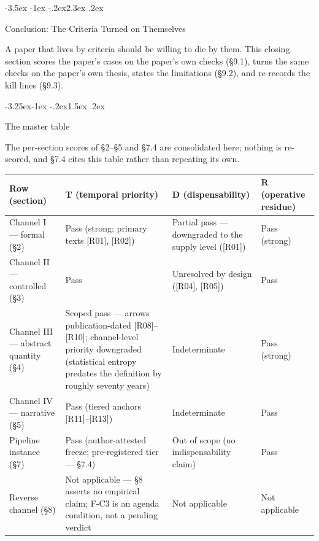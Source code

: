 \documentclass[11pt,a4paper]{article}
\makeatletter
\renewcommand\section{\@startsection{section}{1}{\z@}%
  {-3.5ex \@plus -1ex \@minus -.2ex}{2.3ex \@plus .2ex}%
  {\normalfont\Large\bfseries\raggedright}}
\renewcommand\subsection{\@startsection{subsection}{2}{\z@}%
  {-3.25ex\@plus -1ex \@minus -.2ex}{1.5ex \@plus .2ex}%
  {\normalfont\large\bfseries\raggedright}}
\makeatother
\begin{document}
\section{Conclusion: The Criteria Turned on Themselves}

A paper that lives by criteria should be willing to die by them. This closing section scores the paper's cases on the paper's own checks (§9.1), turns the same checks on the paper's own thesis, states the limitations (§9.2), and re-records the kill lines (§9.3).

\subsection{The master table}

The per-section scores of §2–§5 and §7.4 are consolidated here; nothing is re-scored, and §7.4 cites this table rather than repeating its own.

\begin{table}[htbp]
\centering
\footnotesize
\setlength{\tabcolsep}{3.5pt}
\renewcommand{\arraystretch}{1.18}
\begin{tabularx}{0.985\textwidth}{@{}>{\raggedright\arraybackslash}p{}>{\raggedright\arraybackslash}X>{\raggedright\arraybackslash}X>{\raggedright\arraybackslash}X@{}}
\toprule
\textbf{Row (section)} & \textbf{T (temporal priority)} & \textbf{D (dispensability)} & \textbf{R (operative residue)} \\
\midrule
Channel I — formal (§2) & Pass (strong; primary texts [R01], [R02]) & Partial pass — downgraded to the supply level ([R01]) & Pass (strong) \\
Channel II — controlled (§3) & Pass & Unresolved by design ([R04], [R05]) & Pass \\
Channel III — abstract quantity (§4) & Scoped pass — arrows publication-dated [R08]–[R10]; channel-level priority downgraded (statistical entropy predates the definition by roughly seventy years) & Indeterminate & Pass (strong) \\
Channel IV — narrative (§5) & Pass (tiered anchors [R11]–[R13]) & Indeterminate & Pass \\
Pipeline instance (§7) & Pass (author-attested freeze; pre-registered tier — §7.4) & Out of scope (no indispensability claim) & Pass \\
Reverse channel (§8) & Not applicable — §8 asserts no empirical claim; F-C3 is an agenda condition, not a pending verdict & Not applicable & Not applicable \\
\bottomrule
\end{tabularx}
\end{table}
\end{document}
